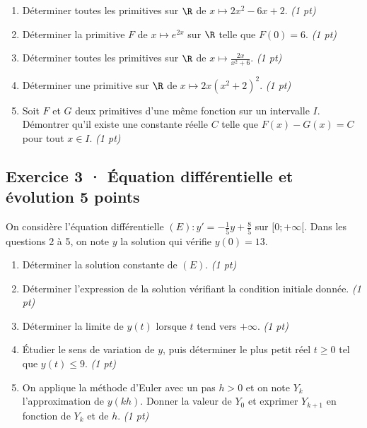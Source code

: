 \begin{enumerate}

\item Déterminer toutes les primitives sur $\R$ de $x\mapsto 2x^2-6x+2$. \hfill\textit{(1 pt)}

\item Déterminer la primitive $F$ de $x\mapsto e^{2x}$ sur $\R$ telle que $F(0)=6$. \hfill\textit{(1 pt)}

\item Déterminer toutes les primitives sur $\R$ de $x\mapsto\frac{2x}{x^2+6}$. \hfill\textit{(1 pt)}

\item Déterminer une primitive sur $\R$ de $x\mapsto2x(x^2+2)^{2}$. \hfill\textit{(1 pt)}

\item Soit $F$ et $G$ deux primitives d'une même fonction sur un intervalle $I$. Démontrer qu'il existe une constante réelle $C$ telle que $F(x)-G(x)=C$ pour tout $x\in I$. \hfill\textit{(1 pt)}

\end{enumerate}

\clearpage{}\par

\subsection*{Exercice 3 · Équation différentielle et évolution \hfill 5 points}On considère l'équation différentielle $(E):y'=-\frac1{5}y+\frac{8}{5}$ sur $[0;+\infty[$. Dans les questions 2 à 5, on note $y$ la solution qui vérifie $y(0)=13$.

\begin{enumerate}

\item Déterminer la solution constante de $(E)$. \hfill\textit{(1 pt)}

\item Déterminer l'expression de la solution vérifiant la condition initiale donnée. \hfill\textit{(1 pt)}

\item Déterminer la limite de $y(t)$ lorsque $t$ tend vers $+\infty$. \hfill\textit{(1 pt)}

\item Étudier le sens de variation de $y$, puis déterminer le plus petit réel $t\ge0$ tel que $y(t)\le9$. \hfill\textit{(1 pt)}

\item On applique la méthode d'Euler avec un pas $h>0$ et on note $Y_k$ l'approximation de $y(kh)$. Donner la valeur de $Y_0$ et exprimer $Y_{k+1}$ en fonction de $Y_k$ et de $h$. \hfill\textit{(1 pt)}

\end{enumerate}

